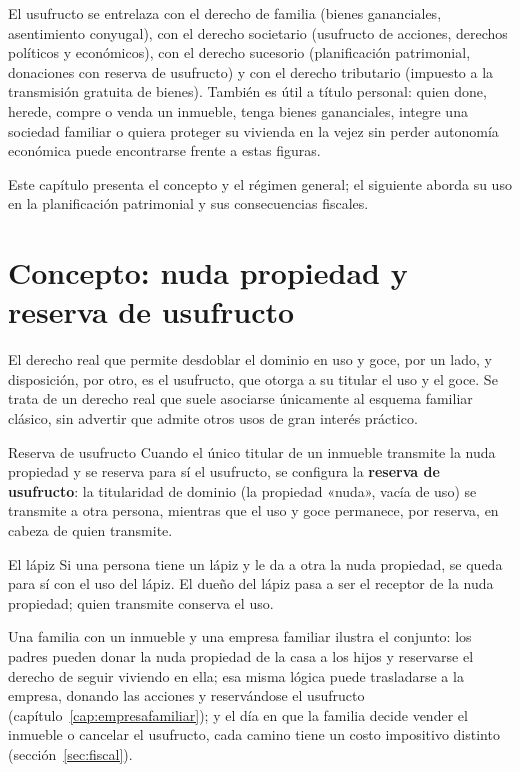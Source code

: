 \documentclass[12pt,oneside]{book}
\begin{document}
El usufructo se entrelaza con el derecho de familia (bienes gananciales, asentimiento conyugal), con el derecho societario (usufructo de acciones, derechos políticos y económicos), con el derecho sucesorio (planificación patrimonial, donaciones con reserva de usufructo) y con el derecho tributario (impuesto a la transmisión gratuita de bienes). También es útil a título personal: quien done, herede, compre o venda un inmueble, tenga bienes gananciales, integre una sociedad familiar o quiera proteger su vivienda en la vejez sin perder autonomía económica puede encontrarse frente a estas figuras.

Este capítulo presenta el concepto y el régimen general; el siguiente aborda su uso en la planificación patrimonial y sus consecuencias fiscales.

\section{Concepto: nuda propiedad y reserva de usufructo}

El derecho real que permite desdoblar el dominio en uso y goce, por un lado, y disposición, por otro, es el usufructo, que otorga a su titular el uso y el goce. Se trata de un derecho real que suele asociarse únicamente al esquema familiar clásico, sin advertir que admite otros usos de gran interés práctico.

\begin{definition}{Reserva de usufructo}
Cuando el único titular de un inmueble transmite la nuda propiedad y se reserva para sí el usufructo, se configura la \textbf{reserva de usufructo}: la titularidad de dominio (la propiedad «nuda», vacía de uso) se transmite a otra persona, mientras que el uso y goce permanece, por reserva, en cabeza de quien transmite.
\end{definition}

\begin{example}{El lápiz}
Si una persona tiene un lápiz y le da a otra la nuda propiedad, se queda para sí con el uso del lápiz. El dueño del lápiz pasa a ser el receptor de la nuda propiedad; quien transmite conserva el uso.
\end{example}

Una familia con un inmueble y una empresa familiar ilustra el conjunto: los padres pueden donar la nuda propiedad de la casa a los hijos y reservarse el derecho de seguir viviendo en ella; esa misma lógica puede trasladarse a la empresa, donando las acciones y reservándose el usufructo (capítulo~\ref{cap:empresafamiliar}); y el día en que la familia decide vender el inmueble o cancelar el usufructo, cada camino tiene un costo impositivo distinto (sección~\ref{sec:fiscal}).
\end{document}
